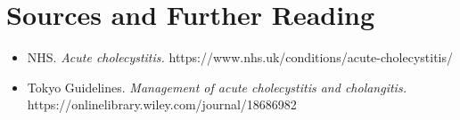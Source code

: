 \section*{Sources and Further Reading}
\begin{itemize}
    \item NHS. \textit{Acute cholecystitis.} https://www.nhs.uk/conditions/acute-cholecystitis/
    \item Tokyo Guidelines. \textit{Management of acute cholecystitis and cholangitis.} https://onlinelibrary.wiley.com/journal/18686982
\end{itemize}
